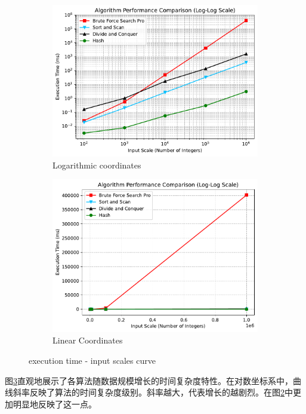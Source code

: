 \documentclass[UTF8,12pt,a4paper]{ctexart}
\begin{document}
\begin{figure}[htbp]
    \centering
    \begin{subfigure}[b]{0.48\textwidth} %
        \centering
        \includegraphics[width=\textwidth]{figures/Time_Scale.pdf} %
        \caption{Logarithmic coordinates}
        \label{fig:time-scale_log}
    \end{subfigure}
    \hfill %
    \begin{subfigure}[b]{0.48\textwidth}
        \centering
        \includegraphics[width=\textwidth]{figures/Time_Scale_Linear.pdf} %
        \caption{Linear Coordinates}
        \label{fig:time-scale_lin}
    \end{subfigure}
    \caption{execution time - input scales curve}
    \label{fig:time-scale}
\end{figure}
图\ref{fig:time-scale}直观地展示了各算法随数据规模增长的时间复杂度特性。在对数坐标系中，曲线斜率反映了算法的时间复杂度级别。斜率越大，代表增长的越剧烈。在图\ref{fig:time-scale_lin}中更加明显地反映了这一点。
\newpage
\end{document}
